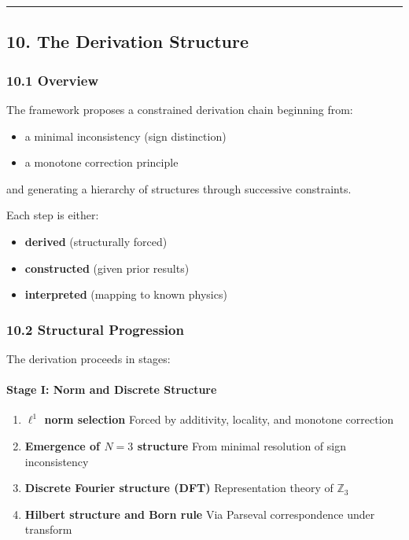 \documentclass[
]{article}
\providecommand{\tightlist}{%
  \setlength{\itemsep}{0pt}\setlength{\parskip}{0pt}}
\begin{document}
\begin{center}\rule{0.5\linewidth}{0.5pt}\end{center}

\hypertarget{the-derivation-structure}{%
\subsection{10. The Derivation
Structure}\label{the-derivation-structure}}

\hypertarget{overview}{%
\subsubsection{10.1 Overview}\label{overview}}

The framework proposes a constrained derivation chain beginning from:

\begin{itemize}
\tightlist
\item
  a minimal inconsistency (sign distinction)
\item
  a monotone correction principle
\end{itemize}

and generating a hierarchy of structures through successive constraints.

Each step is either:

\begin{itemize}
\tightlist
\item
  \textbf{derived} (structurally forced)
\item
  \textbf{constructed} (given prior results)
\item
  \textbf{interpreted} (mapping to known physics)
\end{itemize}

\hypertarget{structural-progression}{%
\subsubsection{10.2 Structural
Progression}\label{structural-progression}}

The derivation proceeds in stages:

\hypertarget{stage-i-norm-and-discrete-structure}{%
\paragraph{Stage I: Norm and Discrete
Structure}\label{stage-i-norm-and-discrete-structure}}

\begin{enumerate}
\def\labelenumi{\arabic{enumi}.}
\item
  \textbf{\(\ell^1\) norm selection} Forced by additivity, locality, and
  monotone correction
\item
  \textbf{Emergence of \(N = 3\) structure} From minimal resolution of
  sign inconsistency
\item
  \textbf{Discrete Fourier structure (DFT)} Representation theory of
  \(\mathbb{Z}_3\)
\item
  \textbf{Hilbert structure and Born rule} Via Parseval correspondence
  under transform
\end{enumerate}
\end{document}
